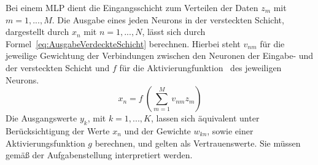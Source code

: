 \documentclass[times, 11pt,twocolumn]{article}
\begin{document}
Bei einem MLP dient die Eingangsschicht zum Verteilen der Daten $z_m$ mit $m=1,...,M$. Die Ausgabe eines jeden Neurons in der versteckten Schicht, dargestellt durch $x_n$ mit $n=1,...,N$, lässt sich durch Formel~\ref{eq:AusgabeVerdeckteSchicht} berechnen. Hierbei steht $v_{nm}$ für die jeweilige Gewichtung der Verbindungen zwischen den Neuronen der Eingabe- und der versteckten Schicht und $f$ für die Aktivierungfunktion~\cite{NNStanley}\cite{NNHaykin} des jeweiligen Neurons. 
\footnotesize
\begin{equation} 
x_n = f~(\sum_{m=1}^M v_{nm}z_m)
	\label{eq:AusgabeVerdeckteSchicht}
\end{equation}
\small
Die Ausgangswerte $y_k$, mit $k=1,...,K$, lassen sich äquivalent unter Berücksichtigung der Werte $x_n$ und der Gewichte $w_{kn}$, sowie einer Aktivierungsfunktion $g$ berechnen, und gelten als Vertrauenswerte. Sie müssen gemäß der Aufgabenstellung interpretiert werden. 
\end{document}
